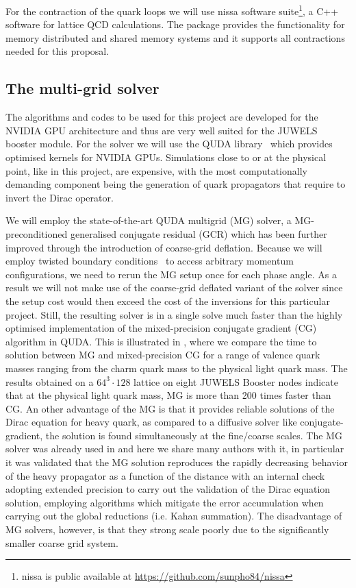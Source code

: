For the contraction of the quark loops we will use nissa software
suite\footnote{nissa is public available at
\url{https://github.com/sunpho84/nissa}}, a C++  software for lattice
QCD calculations. The package provides the functionality for memory
distributed and shared memory systems and it supports all contractions 
needed for this proposal.

\subsection{The multi-grid solver}
The algorithms and codes to be used for this project are developed  for the NVIDIA GPU architecture
and thus are very well suited for the JUWELS booster module. For the solver we will use the QUDA library~\cite{Clark:2009wm,Babich:2011np,Clark:2016rdz} which provides optimised kernels for NVIDIA GPUs.
Simulations close to or at the physical point, like in this project, are  expensive, with the most computationally demanding component being the generation of quark propagators that require to invert the Dirac operator.

We will employ the state-of-the-art QUDA multigrid (MG) solver, a MG-preconditioned generalised conjugate residual (GCR) which has been further improved through the introduction of coarse-grid deflation.
Because we will employ twisted boundary conditions~\cite{deDivitiis:2004kq} to access arbitrary momentum configurations, we need to rerun the MG setup once for each phase angle.
As a result we will not make use of the coarse-grid deflated variant of the solver since the setup cost would then exceed the cost of the inversions for this particular project.
Still, the resulting solver is in a single solve much faster than the highly optimised implementation of the mixed-precision conjugate gradient (CG) algorithm in QUDA.
This is illustrated in , where we compare the time to solution between MG and mixed-precision CG for a range of valence quark masses ranging from the charm quark mass to the physical light quark mass.
The results obtained on a $64^3 \cdot 128$ lattice on eight JUWELS Booster nodes indicate that at the physical light quark mass, MG is more than 200 times faster than CG.
An other advantage of the MG  is that it provides reliable solutions
of the Dirac equation for heavy quark, as compared to a diffusive
solver like conjugate-gradient, the solution is found simultaneously at the fine/coarse scales. 
The MG solver was already used in \cite{Frezzotti:2024kqk} and here we share many authors with it,
in particular it was validated that the MG solution reproduces the
rapidly decreasing behavior of the heavy propagator as a function of the distance with an 
internal check adopting extended precision to carry out the validation of the Dirac equation solution,
employing algorithms which mitigate the error accumulation when carrying out the global reductions
(i.e. Kahan summation).
The disadvantage of MG solvers, however, is that they strong scale poorly due to the significantly smaller coarse grid system.

